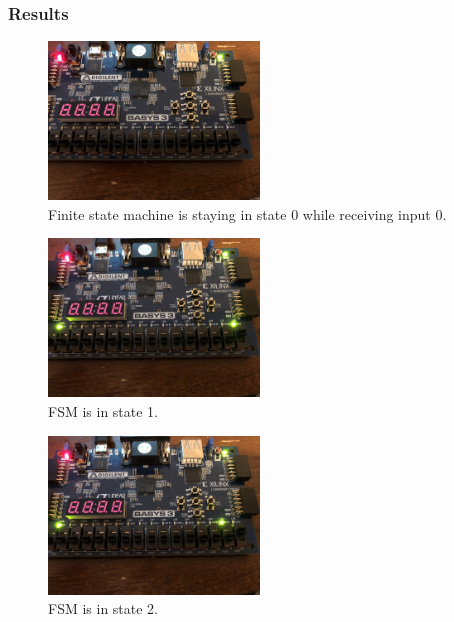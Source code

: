 \documentclass[11pt]{article}
\begin{document}
\subsubsection{Results}

\begin{figure}[H]
\begin{center}
	\includegraphics[width=0.5\textwidth]{./images/p2/IMG_2172.jpg}
	\caption{\label{fig:fsm_res1}Finite state machine is staying in state 0 while receiving input 0.}
\end{center}
\end{figure}

\begin{figure}[H]
\begin{center}
	\includegraphics[width=0.5\textwidth]{./images/p2/IMG_9245.jpg}
	\caption{\label{fig:fsm_res2}FSM is in state 1.}
\end{center}
\end{figure}

\begin{figure}[H]
\begin{center}
	\includegraphics[width=0.5\textwidth]{./images/p2/IMG_1509.jpg}
	\caption{\label{fig:fsm_res3}FSM is in state 2.}
\end{center}
\end{figure}
\end{document}
